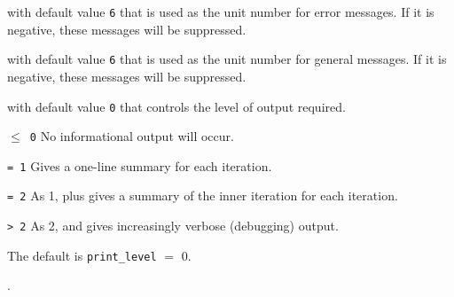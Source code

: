 

\vspace{2mm}

\begin{description}

with default value {\tt 6} that is used as the unit number for error messages. 
If it is negative, these messages will be suppressed.

with default value {\tt 6} that is used as the unit number for general messages. If it is negative, these messages will be suppressed.

with default value {\tt 0} that controls the level of output required.
\begin{description}
\item{\tt $\leq$ 0} No informational output will occur.
\item{\tt = 1} Gives a one-line summary for each iteration.
\item{\tt = 2} As 1, plus gives a summary of the inner iteration for each iteration.
\item{\tt > 2} As 2, and gives increasingly verbose (debugging) output.
\end{description}
The default is {\tt print\_level} $=$ 0.
\end{description}

.

